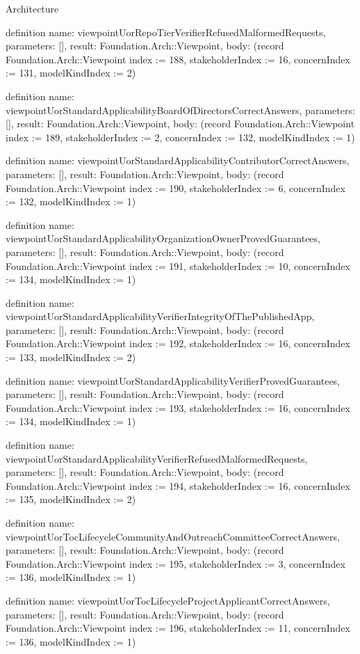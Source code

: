 \begin{lexlean}{Architecture}
\begin{semanticmodule}
definition{
  name: viewpointUorRepoTierVerifierRefusedMalformedRequests,
  parameters: [],
  result: Foundation.Arch::Viewpoint,
  body: (record Foundation.Arch::Viewpoint {index := 188, stakeholderIndex := 16, concernIndex := 131, modelKindIndex := 2})
}

definition{
  name: viewpointUorStandardApplicabilityBoardOfDirectorsCorrectAnswers,
  parameters: [],
  result: Foundation.Arch::Viewpoint,
  body: (record Foundation.Arch::Viewpoint {index := 189, stakeholderIndex := 2, concernIndex := 132, modelKindIndex := 1})
}

definition{
  name: viewpointUorStandardApplicabilityContributorCorrectAnswers,
  parameters: [],
  result: Foundation.Arch::Viewpoint,
  body: (record Foundation.Arch::Viewpoint {index := 190, stakeholderIndex := 6, concernIndex := 132, modelKindIndex := 1})
}

definition{
  name: viewpointUorStandardApplicabilityOrganizationOwnerProvedGuarantees,
  parameters: [],
  result: Foundation.Arch::Viewpoint,
  body: (record Foundation.Arch::Viewpoint {index := 191, stakeholderIndex := 10, concernIndex := 134, modelKindIndex := 1})
}

definition{
  name: viewpointUorStandardApplicabilityVerifierIntegrityOfThePublishedApp,
  parameters: [],
  result: Foundation.Arch::Viewpoint,
  body: (record Foundation.Arch::Viewpoint {index := 192, stakeholderIndex := 16, concernIndex := 133, modelKindIndex := 2})
}

definition{
  name: viewpointUorStandardApplicabilityVerifierProvedGuarantees,
  parameters: [],
  result: Foundation.Arch::Viewpoint,
  body: (record Foundation.Arch::Viewpoint {index := 193, stakeholderIndex := 16, concernIndex := 134, modelKindIndex := 1})
}

definition{
  name: viewpointUorStandardApplicabilityVerifierRefusedMalformedRequests,
  parameters: [],
  result: Foundation.Arch::Viewpoint,
  body: (record Foundation.Arch::Viewpoint {index := 194, stakeholderIndex := 16, concernIndex := 135, modelKindIndex := 2})
}

definition{
  name: viewpointUorTocLifecycleCommunityAndOutreachCommitteeCorrectAnswers,
  parameters: [],
  result: Foundation.Arch::Viewpoint,
  body: (record Foundation.Arch::Viewpoint {index := 195, stakeholderIndex := 3, concernIndex := 136, modelKindIndex := 1})
}

definition{
  name: viewpointUorTocLifecycleProjectApplicantCorrectAnswers,
  parameters: [],
  result: Foundation.Arch::Viewpoint,
  body: (record Foundation.Arch::Viewpoint {index := 196, stakeholderIndex := 11, concernIndex := 136, modelKindIndex := 1})
}


\end{semanticmodule}
\end{lexlean}
